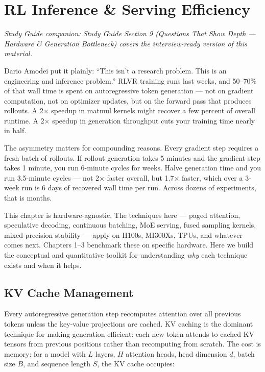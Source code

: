 \section{RL Inference \& Serving Efficiency}

\smallskip\noindent\textit{Study Guide companion: Study Guide Section 9 (Questions That Show Depth --- Hardware \& Generation Bottleneck) covers the interview-ready version of this material.}
\smallskip

\begin{whythis}
Dario Amodei put it plainly: ``This isn't a research problem. This is an engineering and inference problem.'' RLVR training runs last weeks, and 50--70\% of that wall time is spent on autoregressive token generation --- not on gradient computation, not on optimizer updates, but on the forward pass that produces rollouts. A 2$\times$ speedup in matmul kernels might recover a few percent of overall runtime. A 2$\times$ speedup in generation throughput cuts your training time nearly in half.

The asymmetry matters for compounding reasons. Every gradient step requires a fresh batch of rollouts. If rollout generation takes 5 minutes and the gradient step takes 1 minute, you run 6-minute cycles for weeks. Halve generation time and you run 3.5-minute cycles --- not 2$\times$ faster overall, but 1.7$\times$ faster, which over a 3-week run is 6 days of recovered wall time per run. Across dozens of experiments, that is months.

This chapter is hardware-agnostic. The techniques here --- paged attention, speculative decoding, continuous batching, MoE serving, fused sampling kernels, mixed-precision stability --- apply on H100s, MI300Xs, TPUs, and whatever comes next. Chapters 1--3 benchmark these on specific hardware. Here we build the conceptual and quantitative toolkit for understanding \textit{why} each technique exists and when it helps.
\end{whythis}

\subsection{KV Cache Management}

Every autoregressive generation step recomputes attention over all previous tokens unless the key-value projections are cached. KV caching is the dominant technique for making generation efficient: each new token attends to cached KV tensors from previous positions rather than recomputing from scratch. The cost is memory: for a model with $L$ layers, $H$ attention heads, head dimension $d$, batch size $B$, and sequence length $S$, the KV cache occupies:

